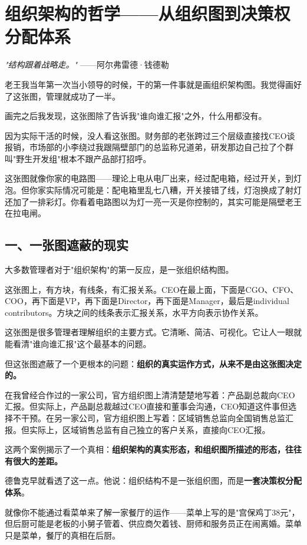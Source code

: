\chapter{组织架构的哲学——从组织图到决策权分配体系}


\textit{"结构跟着战略走。"}
——阿尔弗雷德·钱德勒


老王我当年第一次当小领导的时候，干的第一件事就是画组织架构图。我觉得画好了这张图，管理就成功了一半。

画完之后我发现，这张图除了告诉我"谁向谁汇报"之外，什么用都没有。

因为实际干活的时候，没人看这张图。财务部的老张跨过三个层级直接找CEO谈报销，市场部的小李绕过我跟隔壁部门的总监称兄道弟，研发那边自己拉了个群叫"野生开发组"根本不跟产品部打招呼。

这张图就像你家的电路图——理论上电从电厂出来，经过配电箱，经过开关，到灯泡。但你家实际情况可能是：配电箱里乱七八糟，开关接错了线，灯泡换成了射灯还加了一排彩灯。你看着电路图以为灯一亮一灭是你控制的，其实可能是隔壁老王在拉电闸。

\section{一、一张图遮蔽的现实}


大多数管理者对于"组织架构"的第一反应，是一张组织结构图。

这张图上，有方块，有线条，有汇报关系。CEO在最上面，下面是CGO、CFO、COO，再下面是VP，再下面是Director，再下面是Manager，最后是individual contributors。方块之间的线条表示汇报关系，水平方向表示协作关系。

这张图是很多管理者理解组织的主要方式。它清晰、简洁、可视化。它让人一眼就能看清"谁向谁汇报"这个最基本的问题。

但这张图遮蔽了一个更根本的问题：\textbf{组织的真实运作方式，从来不是由这张图决定的。}

在我曾经合作过的一家公司，官方组织图上清清楚楚地写着：产品副总裁向CEO汇报。但实际上，产品副总裁越过CEO直接和董事会沟通，CEO知道这件事但选择不干预。在另一家公司，官方组织图上写着：区域销售总监向全国销售总监汇报。但实际上，区域销售总监有自己独立的客户关系，直接向CEO汇报。

这两个案例揭示了一个真相：\textbf{组织架构的真实形态，和组织图所描述的形态，往往有很大的差距。}

德鲁克早就看透了这一点。他说：组织结构不是一张组织图，而是\textbf{一套决策权分配体系}。

就像你不能通过看菜单来了解一家餐厅的运作——菜单上写的是"宫保鸡丁38元"，但后厨可能是老板的小舅子管着、供应商欠着钱、厨师和服务员正在闹离婚。菜单只是菜单，餐厅的真相在后厨。

